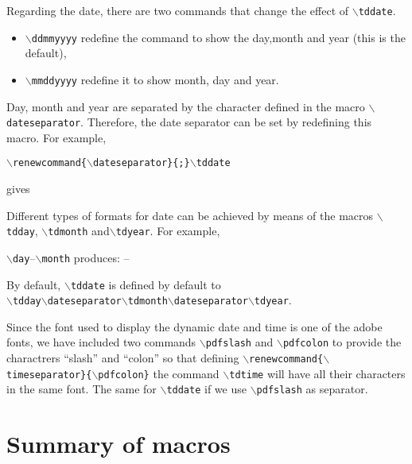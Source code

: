 \documentclass{article}
\begin{document}
\bigskip

Regarding the date, there are two commands that change the effect of \texttt{$\backslash$tddate}.
\begin{itemize}
\item \texttt{$\backslash$ddmmyyyy} redefine the command to show the day,month and year (this is the default),
\item \texttt{$\backslash$mmddyyyy} redefine it to show month, day and year.
\end{itemize}

Day, month and year are separated by the character defined in the macro \texttt{$\backslash$dateseparator}.
Therefore, the date separator can be set by redefining this macro.  For example,

\centerline{\texttt{$\backslash$renewcommand\{$\backslash$dateseparator\}\{;\}$\backslash$tddate}}

gives

\centerline{\renewcommand{\dateseparator}{;}\tddate}

Different types of formats for date can be achieved by means of the macros \texttt{$\backslash$tdday}, \texttt{$\backslash$tdmonth} and\texttt{$\backslash$tdyear}.  For example,

\noindent\texttt{$\backslash$day}--\texttt{$\backslash$month}
produces:  \quad \tdday--\tdmonth

By default, \texttt{$\backslash$tddate} is defined by default to \\
\texttt{$\backslash$tdday$\backslash$dateseparator$\backslash$tdmonth$\backslash$dateseparator$\backslash$tdyear}.

Since the font used to display the dynamic date and time is one of the adobe fonts, we have included two commands \texttt{$\backslash$pdfslash} and \texttt{$\backslash$pdfcolon} to provide the charactrers ``slash'' and ``colon'' so that defining
\texttt{$\backslash$renewcommand\{$\backslash$timeseparator\}\{$\backslash$pdfcolon\}}
the command \texttt{$\backslash$tdtime} will have all their characters in the same font.
The same for \texttt{$\backslash$tddate} if we use \texttt{$\backslash$pdfslash} as separator.

\newpage
\section{Summary of macros}
\end{document}
